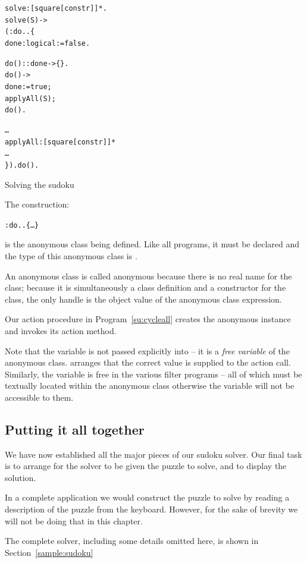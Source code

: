 \begin{program}
\vspace{0.5ex}
\begin{alltt}
  solve:[square[constr]]*.
  solve(S) ->
    (:do..\{
      done:logical:=false.
      
      do()::done -> \{\}.
      do() ->
        done:=true;
        applyAll(S);
        do().
        
      \ldots
      applyAll:[square[constr]]*
      \ldots
    \}).do().
\end{alltt}
\vspace{-2ex}
\caption{Solving the sudoku}
\label{su:cycleall}
\end{program}
The construction:
\begin{alltt}
:do..\{ \ldots \}
\end{alltt}
is the anonymous class being defined. Like all programs, it must be declared and the type of this anonymous class is . 

An anonymous class is called anonymous because there is no real name for the class; because it is simultaneously a class definition and a constructor for the class, the only handle is the object value of the anonymous class expression.

Our  action procedure in Program~\vref{su:cycleall} creates the anonymous instance and invokes its  action method.

Note that the variable  is not passed explicitly into  -- it is a \emph{free variable} of the anonymous class. \go arranges that the correct value is supplied to the  action call. Similarly, the  variable is free in the various filter programs -- all of which must be textually located within the  anonymous class otherwise the variable  will not be accessible to them.

\subsection{Putting it all together}
We have now established all the major pieces of our sudoku solver. Our final task is to arrange for the solver to be given the puzzle to solve, and to display the solution. 

In a complete application we would construct the puzzle to solve by reading a description of the puzzle from the keyboard. However, for the sake of brevity we will not be doing that in this chapter. 

The complete  solver, including some details omitted here, is shown in Section~\vref{sample:sudoku}

